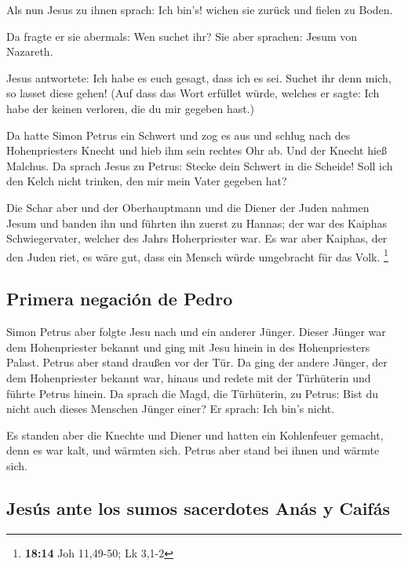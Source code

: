  Als nun Jesus zu ihnen sprach: Ich bin's! wichen sie
zurück und fielen zu Boden.

 Da fragte er sie abermals: Wen suchet ihr? Sie aber
sprachen: Jesum von Nazareth.

 Jesus antwortete: Ich habe es euch gesagt, dass ich es
sei. Suchet ihr denn mich, so lasset diese gehen!  (Auf
dass das Wort erfüllet würde, welches er sagte: Ich habe der keinen
verloren, die du mir gegeben hast.)

 Da hatte Simon Petrus ein Schwert und zog es aus und
schlug nach des Hohenpriesters Knecht und hieb ihm sein rechtes Ohr ab.
Und der Knecht hieß Malchus.  Da sprach Jesus zu Petrus:
Stecke dein Schwert in die Scheide! Soll ich den Kelch nicht trinken,
den mir mein Vater gegeben hat?

 Die Schar aber und der Oberhauptmann und die Diener der
Juden nahmen Jesum und banden ihn  und führten ihn zuerst
zu Hannas; der war des Kaiphas Schwiegervater, welcher des Jahrs
Hoherpriester war.  Es war aber Kaiphas, der den Juden
riet, es wäre gut, dass ein Mensch würde umgebracht für das Volk.
\footnote{\textbf{18:14} Joh 11,49-50; Lk 3,1-2}

\hypertarget{primera-negaciuxf3n-de-pedro}{%
\subsection{Primera negación de
Pedro}\label{primera-negaciuxf3n-de-pedro}}

 Simon Petrus aber folgte Jesu nach und ein anderer
Jünger. Dieser Jünger war dem Hohenpriester bekannt und ging mit Jesu
hinein in des Hohenpriesters Palast.  Petrus aber stand
draußen vor der Tür. Da ging der andere Jünger, der dem Hohenpriester
bekannt war, hinaus und redete mit der Türhüterin und führte Petrus
hinein.  Da sprach die Magd, die Türhüterin, zu Petrus:
Bist du nicht auch dieses Menschen Jünger einer? Er sprach: Ich bin's
nicht.

 Es standen aber die Knechte und Diener und hatten ein
Kohlenfeuer gemacht, denn es war kalt, und wärmten sich. Petrus aber
stand bei ihnen und wärmte sich.

\hypertarget{jesuxfas-ante-los-sumos-sacerdotes-anuxe1s-y-caifuxe1s}{%
\subsection{Jesús ante los sumos sacerdotes Anás y
Caifás}\label{jesuxfas-ante-los-sumos-sacerdotes-anuxe1s-y-caifuxe1s}}

